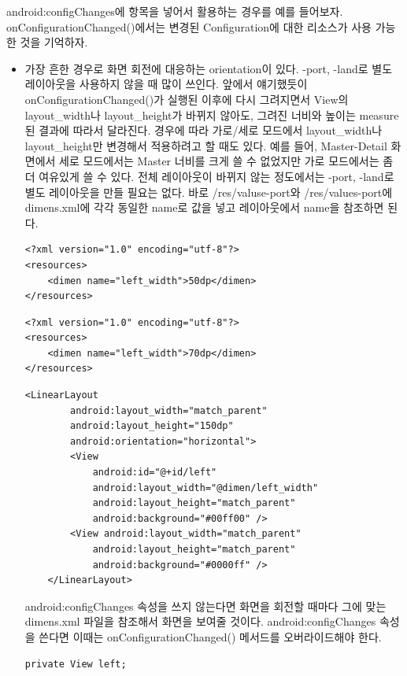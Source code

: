 android:configChanges에 항목을 넣어서 활용하는 경우를 예를 들어보자. 
onConfigurationChanged()에서는 변경된 Configuration에 대한 리소스가 사용 가능한 것을 기억하자. 
\begin{itemize}
\item 가장 흔한 경우로 화면 회전에 대응하는 orientation이 있다. -port, -land로 별도 레이아웃을 사용하지 않을 때 많이 쓰인다. 앞에서 얘기했듯이 onConfigurationChanged()가 실행된 이후에 다시 그려지면서 View의 layout\_width나 layout\_height가 바뀌지 않아도, 그려진 너비와 높이는 measure된 결과에 따라서 달라진다.
경우에 따라 가로/세로 모드에서 layout\_width나 layout\_height만 변경해서 적용하려고 할 때도 있다. 
예를 들어, Master-Detail 화면에서 세로 모드에서는 Master 너비를 크게 쓸 수 없었지만 가로 모드에서는 좀 더 여유있게 쓸 수 있다. 전체 레이아웃이 바뀌지 않는 정도에서는 -port, -land로 별도 레이아웃을 만들 필요는 없다.
바로 /res/valuse-port와 /res/values-port에 dimens.xml에 각각 동일한 name로 값을 넣고 레이아웃에서 name을 참조하면 된다.
\begin{lstlisting}[frame=single, caption=/res/values-port/dimens.xml]
<?xml version="1.0" encoding="utf-8"?>
<resources>
	<dimen name="left_width">50dp</dimen>
</resources>
\end{lstlisting}

\begin{lstlisting}[frame=single, caption=/res/values-land/dimens.xml]
<?xml version="1.0" encoding="utf-8"?>
<resources>
	<dimen name="left_width">70dp</dimen>
</resources>
\end{lstlisting}

\begin{lstlisting}[frame=single, caption=/res/layout/view\_list.xml 일부분]
	<LinearLayout
		android:layout_width="match_parent"
		android:layout_height="150dp"
		android:orientation="horizontal">
		<View
			android:id="@+id/left"
			android:layout_width="@dimen/left_width"
			android:layout_height="match_parent"
			android:background="#00ff00" />
		<View android:layout_width="match_parent"
			android:layout_height="match_parent"
			android:background="#0000ff" />
	</LinearLayout>		
\end{lstlisting}
android:configChanges 속성을 쓰지 않는다면 화면을 회전할 때마다 그에 맞는 dimens.xml 파일을 참조해서 화면을 보여줄 것이다. 
android:configChanges 속성을 쓴다면 이때는 onConfigurationChanged() 메서드를 오버라이드해야 한다.

\begin{lstlisting}[frame=single]
	private View left;


\end{lstlisting}
\end{itemize}
